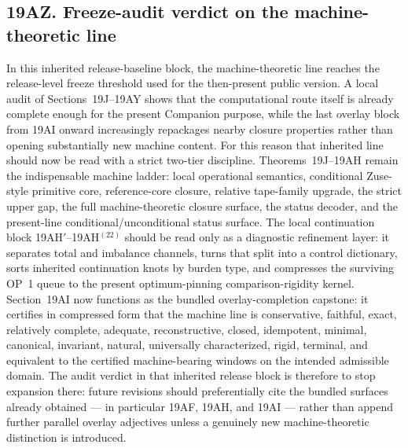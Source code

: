\subsection*{19AZ. Freeze-audit verdict on the machine-theoretic line}
In this inherited release-baseline block, the machine-theoretic line reaches the release-level freeze threshold used for the then-present public version. A local audit of Sections~19J--19AY shows that the computational route itself is already complete enough for the present Companion purpose, while the last overlay block from 19AI onward increasingly repackages nearby closure properties rather than opening substantially new machine content. For this reason that inherited line should now be read with a strict two-tier discipline. Theorems~19J--19AH remain the indispensable machine ladder: local operational semantics, conditional Zuse-style primitive core, reference-core closure, relative tape-family upgrade, the strict upper gap, the full machine-theoretic closure surface, the status decoder, and the present-line conditional/unconditional status surface. The local continuation block 19AH$\prime$--19AH$^{(22)}$ should be read only as a diagnostic refinement layer: it separates total and imbalance channels, turns that split into a control dictionary, sorts inherited continuation knots by burden type, and compresses the surviving OP~1 queue to the present optimum-pinning comparison-rigidity kernel. Section~19AI now functions as the bundled overlay-completion capstone: it certifies in compressed form that the machine line is conservative, faithful, exact, relatively complete, adequate, reconstructive, closed, idempotent, minimal, canonical, invariant, natural, universally characterized, rigid, terminal, and equivalent to the certified machine-bearing windows on the intended admissible domain. The audit verdict in that inherited release block is therefore to stop expansion there: future revisions should preferentially cite the bundled surfaces already obtained --- in particular 19AF, 19AH, and 19AI --- rather than append further parallel overlay adjectives unless a genuinely new machine-theoretic distinction is introduced.

